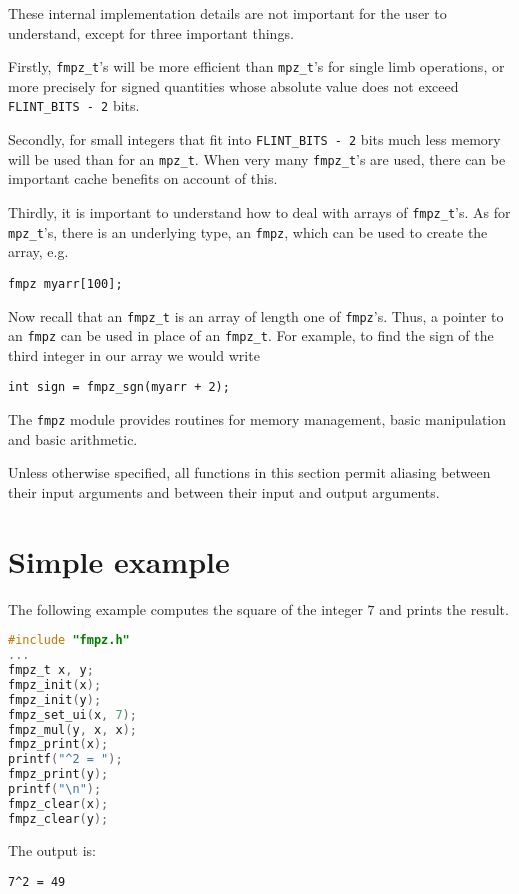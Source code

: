 \documentclass[a4paper,10pt]{book}
\newcommand{\code}{\lstinline}
\begin{document}
These internal implementation details are not important for the user to 
understand, except for three important things.

Firstly, \code{fmpz_t}'s will be more efficient than \code{mpz_t}'s for 
single limb operations, or more precisely for signed quantities whose 
absolute value does not exceed \code{FLINT_BITS - 2} bits.

Secondly, for small integers that fit into \code{FLINT_BITS - 2} bits 
much less memory will be used than for an \code{mpz_t}.  When very many 
\code{fmpz_t}'s are used, there can be important cache benefits on 
account of this.

Thirdly, it is important to understand how to deal with arrays of 
\code{fmpz_t}'s.  As for \code{mpz_t}'s, there is an underlying type, 
an \code{fmpz}, which can be used to create the array, e.g.\ 
\begin{lstlisting}
fmpz myarr[100];
\end{lstlisting}
Now recall that an \code{fmpz_t} is an array of length one of \code{fmpz}'s.
Thus, a pointer to an \code{fmpz} can be used in place of an \code{fmpz_t}.
For example, to find the sign of the third integer in our array we would 
write 
\begin{lstlisting}
int sign = fmpz_sgn(myarr + 2);
\end{lstlisting}

The \code{fmpz} module provides routines for memory management, basic 
manipulation and basic arithmetic.

Unless otherwise specified, all functions in this section permit aliasing 
between their input arguments and between their input and output 
arguments.

\section{Simple example}

The following example computes the square of the integer $7$ and prints 
the result.
\begin{lstlisting}[language=c]
#include "fmpz.h"
...
fmpz_t x, y;
fmpz_init(x);
fmpz_init(y);
fmpz_set_ui(x, 7);
fmpz_mul(y, x, x);
fmpz_print(x);
printf("^2 = ");
fmpz_print(y);
printf("\n");
fmpz_clear(x);
fmpz_clear(y);
\end{lstlisting}

The output is:
\begin{lstlisting}
7^2 = 49
\end{lstlisting}
\end{document}
